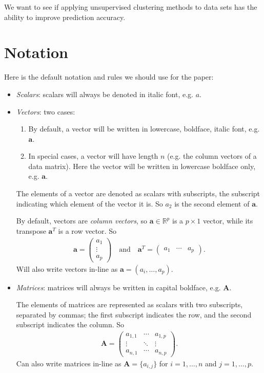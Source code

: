 \documentclass[10pt]{article}
\newcommand{\mydef}[1]{\textcolor{SteelBlue3}{\textit{#1}}} %
\begin{document}
We want to see if applying unsupervised clustering methods to data sets has the ability to improve prediction accuracy. 

\section{Notation}

Here is the default notation and rules we should use for the paper:
\begin{itemize}
    \item \mydef{Scalars}: scalars will always be denoted in italic font, e.g. $a$.
    \item \mydef{Vectors}: two cases:
    \begin{enumerate}
        \item By default, a vector will be written in lowercase, boldface, italic font, e.g. $\bm{a}$.
        \item In special cases, a vector will have length $n$ (e.g. the column vectors of a data matrix). Here the vector will be written in lowercase boldface only, e.g. $\mathbf{a}$.
    \end{enumerate}
    The elements of a vector are denoted as scalars with subscripts, the subscript indicating which element of the vector it is. So $a_2$ is the second element of $\bm{a}$.
    
    By default, vectors are \textit{column vectors}, so $\bm{a} \in \mathbb{R}^p$ is a $p \times 1$ vector, while its transpose $\bm{a}^T$ is a row vector. So 
    \begin{align*}
        \bm{a} = \begin{pmatrix}
            a_1 \\ \vdots \\ a_p
        \end{pmatrix}
        \text{~~~and~~~} 
        \bm{a}^T = \begin{pmatrix}
            a_1 & \cdots & a_p
        \end{pmatrix}.
    \end{align*}
    Will also write vectors in-line as $\bm{a} = (a_i, \ldots, a_p)$.
    \item \mydef{Matrices}: matrices will always be written in capital boldface, e.g. $\mathbf{A}$.
    
    The elements of matrices are represented as scalars with two subscripts, separated by commas; the first subscript indicates the row, and the second subscript indicates the column. So
    \begin{align*}
        \mathbf{A} = \begin{pmatrix}
            a_{1,1} & \cdots & a_{1,p} \\
            \vdots & \ddots & \vdots \\
            a_{n,1} & \cdots & a_{n,p}
        \end{pmatrix}.
    \end{align*}
    Can also write matrices in-line as $\mathbf{A} = \{ a_{i,j} \}$ for $i = 1, \ldots, n$ and $j = 1, \ldots, p$.
    

\end{itemize}
\end{document}
